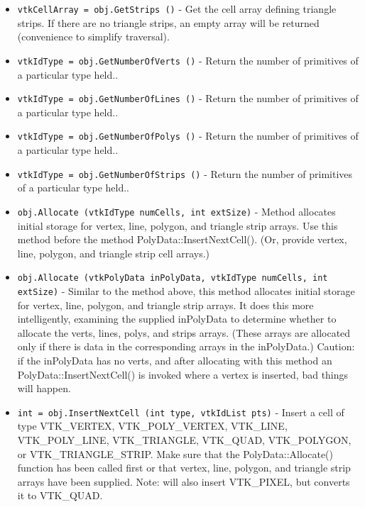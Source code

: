 \begin{itemize}
\item  \verb|vtkCellArray = obj.GetStrips ()| -  Get the cell array defining triangle strips. If there are no
 triangle strips, an empty array will be returned (convenience to 
 simplify traversal).

\item  \verb|vtkIdType = obj.GetNumberOfVerts ()| -  Return the number of primitives of a particular type held..

\item  \verb|vtkIdType = obj.GetNumberOfLines ()| -  Return the number of primitives of a particular type held..

\item  \verb|vtkIdType = obj.GetNumberOfPolys ()| -  Return the number of primitives of a particular type held..

\item  \verb|vtkIdType = obj.GetNumberOfStrips ()| -  Return the number of primitives of a particular type held..

\item  \verb|obj.Allocate (vtkIdType numCells, int extSize)| -  Method allocates initial storage for vertex, line, polygon, and 
 triangle strip arrays. Use this method before the method 
 PolyData::InsertNextCell(). (Or, provide vertex, line, polygon, and
 triangle strip cell arrays.)

\item  \verb|obj.Allocate (vtkPolyData inPolyData, vtkIdType numCells, int extSize)| -  Similar to the method above, this method allocates initial storage for
 vertex, line, polygon, and triangle strip arrays. It does this more
 intelligently, examining the supplied inPolyData to determine whether to
 allocate the verts, lines, polys, and strips arrays.  (These arrays are
 allocated only if there is data in the corresponding arrays in the
 inPolyData.)  Caution: if the inPolyData has no verts, and after
 allocating with this method an PolyData::InsertNextCell() is invoked
 where a vertex is inserted, bad things will happen.

\item  \verb|int = obj.InsertNextCell (int type, vtkIdList pts)| -  Insert a cell of type VTK\_VERTEX, VTK\_POLY\_VERTEX, VTK\_LINE, VTK\_POLY\_LINE,
 VTK\_TRIANGLE, VTK\_QUAD, VTK\_POLYGON, or VTK\_TRIANGLE\_STRIP.  Make sure that
 the PolyData::Allocate() function has been called first or that vertex,
 line, polygon, and triangle strip arrays have been supplied.
 Note: will also insert VTK\_PIXEL, but converts it to VTK\_QUAD.


\end{itemize}
